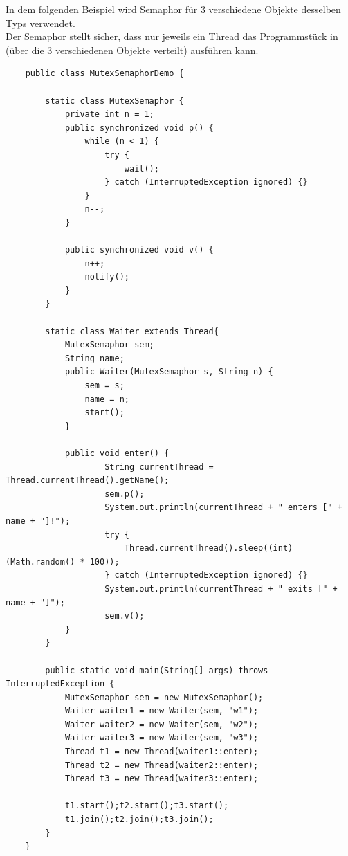 \noindent
In dem folgenden Beispiel wird  Semaphor für 3 verschiedene Objekte desselben Typs verwendet.\\
Der Semaphor stellt sicher, dass nur jeweils ein Thread das Programmstück in  (über die $3$ verschiedenen Objekte verteilt) ausführen kann. \\


\begin{verbatim}
    public class MutexSemaphorDemo {

        static class MutexSemaphor {
            private int n = 1;
            public synchronized void p() {
                while (n < 1) {
                    try {
                        wait();
                    } catch (InterruptedException ignored) {}
                }
                n--;
            }

            public synchronized void v() {
                n++;
                notify();
            }
        }

        static class Waiter extends Thread{
            MutexSemaphor sem;
            String name;
            public Waiter(MutexSemaphor s, String n) {
                sem = s;
                name = n;
                start();
            }

            public void enter() {
                    String currentThread = Thread.currentThread().getName();
                    sem.p();
                    System.out.println(currentThread + " enters [" + name + "]!");
                    try {
                        Thread.currentThread().sleep((int) (Math.random() * 100));
                    } catch (InterruptedException ignored) {}
                    System.out.println(currentThread + " exits [" + name + "]");
                    sem.v();
            }
        }

        public static void main(String[] args) throws InterruptedException {
            MutexSemaphor sem = new MutexSemaphor();
            Waiter waiter1 = new Waiter(sem, "w1");
            Waiter waiter2 = new Waiter(sem, "w2");
            Waiter waiter3 = new Waiter(sem, "w3");
            Thread t1 = new Thread(waiter1::enter);
            Thread t2 = new Thread(waiter2::enter);
            Thread t3 = new Thread(waiter3::enter);

            t1.start();t2.start();t3.start();
            t1.join();t2.join();t3.join();
        }
    }
\end{verbatim}\\

